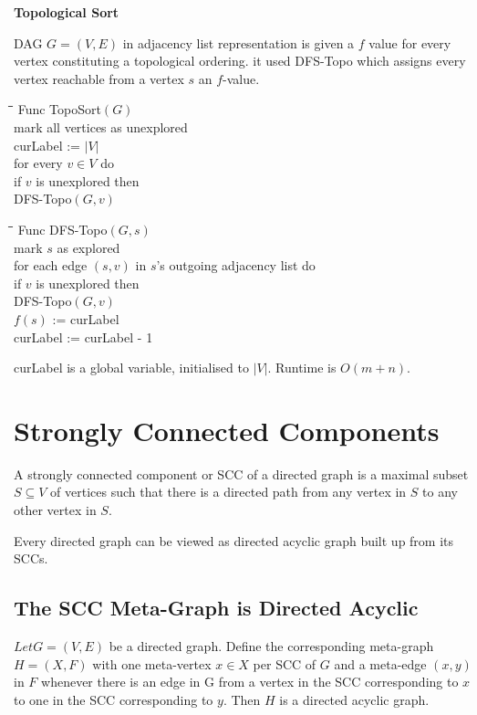 \documentclass{article}
\begin{document}
	\vspace{0.3mm}
	
	\begin{center}
		\begin{large}
			\textbf{Topological Sort}
		\end{large}
	\end{center}
	\vspace{0.1mm}
	DAG $G = (V,E)$ in adjacency list representation is given a $f$ value for every vertex constituting a topological ordering. it used DFS-Topo which assigns every vertex reachable from a vertex $s$ an $f$-value.
	\begin{tabbing}
		\qquad \= \qquad \= \qquad \= \kill
		Func TopoSort$(G)$ \\
		\> mark all vertices as unexplored \\
		\> curLabel := $|V|$ \\
		\> for every $v \in V$ do \\
		\> \> if $v$ is unexplored then \\
		\> \> \> DFS-Topo$(G,v)$
	\end{tabbing}
	
	\begin{tabbing}
		\qquad \= \qquad \= \qquad \= \kill
		Func DFS-Topo$(G,s)$ \\
		\> mark $s$ as explored \\
		\> for each edge $(s,v)$ in $s$'s outgoing adjacency list do \\
		\> \> if $v$ is unexplored then \\
		\> \> \> DFS-Topo$(G,v)$ \\
		\> $f(s)$ := curLabel \\
		\> curLabel := curLabel - 1
	\end{tabbing} curLabel is a global variable, initialised to $|V|$. Runtime is $O(m+n)$.
	
	\section{Strongly Connected Components}
	A strongly connected component or SCC of a directed graph is a maximal subset $S \subseteq V$ of vertices such that there is a directed path from any vertex in $S$ to any other vertex in $S$.
	
	Every directed graph can be viewed as directed acyclic graph built up from its SCCs.
	
	\subsection*{The SCC Meta-Graph is Directed Acyclic}
	$Let G = (V,E)$ be a directed graph. Define the corresponding meta-graph $H = (X,F)$ with one meta-vertex  $x \in X$ per SCC of $G$ and a meta-edge $(x,y)$ in $F$ whenever there is an edge in G from a vertex in the SCC corresponding to $x$ to one in the SCC corresponding to $y$. Then $H$ is a directed acyclic graph.
	
	
\end{document}
